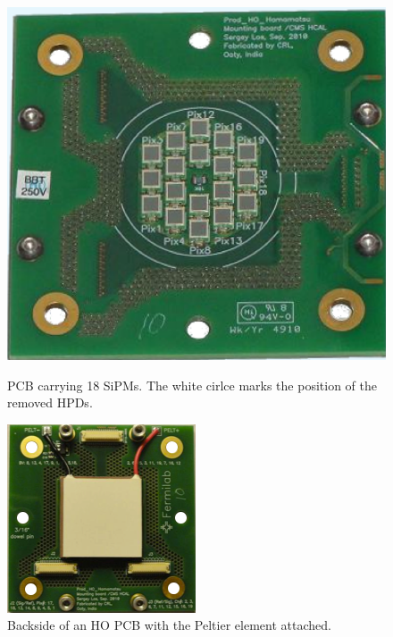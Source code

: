 \begin{figure}[h]
\centering
\begin{minipage}[t]{0.475\textwidth}
\includegraphics[width=\textwidth]{Figures/kuensken/pcbSipm.png}
\caption{PCB carrying 18 SiPMs. The white cirlce marks the position of the removed HPDs.}
\label{sipmPcb}
\end{minipage}
\hspace{1cm}
\begin{minipage}[t]{0.435\textwidth}
\includegraphics[width=\textwidth]{Figures/kuensken/pcbPeltier.png}
\caption{Backside of an HO PCB with the Peltier element attached.}
\label{peltier}
\end{minipage}
\end{figure}
